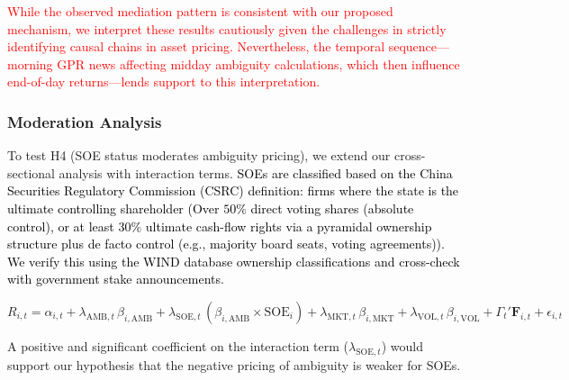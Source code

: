 \documentclass[preprint,12pt,authoryear]{elsarticle}
\begin{document}
\textcolor{black}{\textcolor{red}{While the observed mediation pattern is consistent with our proposed mechanism, we interpret these results cautiously given the challenges in strictly identifying causal chains in asset pricing. Nevertheless, the temporal sequence---morning GPR news affecting midday ambiguity calculations, which then influence end-of-day returns---lends support to this interpretation.}}

\subsubsection{Moderation Analysis}

To test H4 (SOE status moderates ambiguity pricing), we extend our cross-sectional analysis with interaction terms. \textcolor{black}{SOEs are classified based on the China Securities Regulatory Commission (CSRC) definition: firms where the state is the ultimate controlling shareholder (Over $50\%$ direct voting shares (absolute control), or at least $30\%$ ultimate cash-flow rights via a pyramidal ownership structure plus de facto control (e.g., majority board seats, voting agreements)). We verify this using the WIND database ownership classifications and cross-check with government stake announcements.}

\begin{equation}
R_{i,t} = \alpha_{i,t} + \lambda_{\text{AMB},t} \, \beta_{i,\text{AMB}} + \lambda_{\text{SOE},t} \, (\beta_{i,\text{AMB}} \times \text{SOE}_i) + \lambda_{\text{MKT},t} \, \beta_{i,\text{MKT}} + \lambda_{\text{VOL},t} \, \beta_{i,\text{VOL}} + \Gamma_{t}' \mathbf{F}_{i,t} + \epsilon_{i,t}
\end{equation}

A positive and significant coefficient on the interaction term ($\lambda_{\text{SOE},t}$) would support our hypothesis that the negative pricing of ambiguity is weaker for SOEs.
\end{document}

